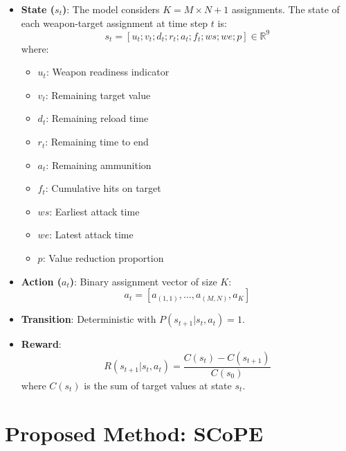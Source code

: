 \documentclass[smallcondensed]{svjour3}
\begin{document}
\begin{itemize}
\item \textbf{State ($s_t$)}: The model considers $K = M \times N + 1$ assignments. The state of each weapon-target assignment at time step $t$ is:
\begin{equation}
\label{eq:state}
s_t = [u_t; v_t; d_t; r_t; a_t; f_t; ws; we; p] \in \mathbb{R}^9
\end{equation}
where:
\begin{itemize}
    \item $u_t$: Weapon readiness indicator
    \item $v_t$: Remaining target value
    \item $d_t$: Remaining reload time
    \item $r_t$: Remaining time to end
    \item $a_t$: Remaining ammunition
    \item $f_t$: Cumulative hits on target
    \item $ws$: Earliest attack time
    \item $we$: Latest attack time
    \item $p$: Value reduction proportion
\end{itemize}

\item \textbf{Action ($a_t$)}: Binary assignment vector of size $K$:
\begin{equation}
    a_t = [a_{(1,1)}, \ldots, a_{(M,N)}, a_{K}]
\end{equation}

\item \textbf{Transition}: Deterministic with $P(s_{t+1} | s_t, a_t) = 1$.

\item \textbf{Reward}:
\begin{equation}
\label{eq:reward}
    R(s_{t+1} | s_t, a_t) = \frac{C(s_t) - C(s_{t+1})}{C(s_{0})}
\end{equation}
where $C(s_t)$ is the sum of target values at state $s_t$.
\end{itemize}

\section{Proposed Method: SCoPE}
\label{sec:method}
\end{document}
